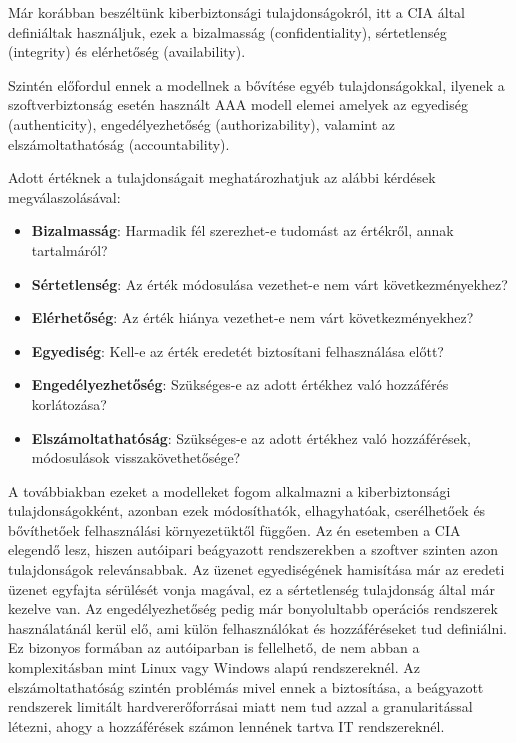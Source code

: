 Már korábban beszéltünk kiberbiztonsági tulajdonságokról, itt a CIA által definiáltak használjuk, ezek a bizalmasság (confidentiality), sértetlenség (integrity) és elérhetőség (availability). 

Szintén előfordul ennek a modellnek a bővítése egyéb tulajdonságokkal, ilyenek a szoftverbiztonság esetén használt AAA modell elemei amelyek az egyediség (authenticity), engedélyezhetőség (authorizability), valamint az elszámoltathatóság (accountability).

Adott értéknek a tulajdonságait meghatározhatjuk az alábbi kérdések megválaszolásával:
\begin{itemize}
    \item \textbf{Bizalmasság}: Harmadik fél szerezhet-e tudomást az értékről, annak tartalmáról?
    \item \textbf{Sértetlenség}: Az érték módosulása vezethet-e nem várt következményekhez?
    \item \textbf{Elérhetőség}: Az érték hiánya vezethet-e nem várt következményekhez?
    \item \textbf{Egyediség}: Kell-e az érték eredetét biztosítani felhasználása előtt?
    \item \textbf{Engedélyezhetőség}: Szükséges-e az adott értékhez való hozzáférés korlátozása?
    \item \textbf{Elszámoltathatóság}: Szükséges-e az adott értékhez való hozzáférések, módosulások visszakövethetősége?
\end{itemize}

A továbbiakban ezeket a modelleket fogom alkalmazni a kiberbiztonsági tulajdonságokként, azonban ezek módosíthatók, elhagyhatóak, cserélhetőek és bővíthetőek felhasználási környezetüktől függően. Az én esetemben a CIA elegendő lesz, hiszen autóipari beágyazott rendszerekben a szoftver szinten azon tulajdonságok relevánsabbak. Az üzenet egyediségének hamisítása már az eredeti üzenet egyfajta sérülését vonja magával, ez a sértetlenség tulajdonság által már kezelve van. Az engedélyezhetőség pedig már bonyolultabb operációs rendszerek használatánál kerül elő, ami külön felhasználókat és hozzáféréseket tud definiálni. Ez bizonyos formában az autóiparban is fellelhető, de nem abban a komplexitásban mint Linux vagy Windows alapú rendszereknél. Az elszámoltathatóság szintén problémás mivel ennek a biztosítása, a beágyazott rendszerek limitált hardvererőforrásai miatt nem tud azzal a granularitással létezni, ahogy a hozzáférések számon lennének tartva IT rendszereknél.


